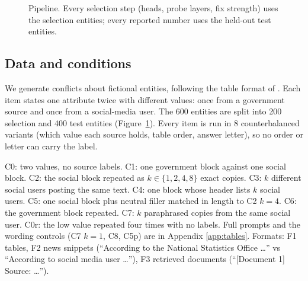 \documentclass[11pt]{article}
\begin{document}
\begin{figure}[t]
\centering
{}
\caption{Pipeline. Every selection step (heads, probe layers, fix strength) uses the selection entities; every reported number uses the held-out test entities.}
\label{fig:pipeline}
\end{figure}

\subsection{Data and conditions}
We generate conflicts about fictional entities, following the table format of \citet{schuster2026whose}. Each item states one attribute twice with different values: once from a government source and once from a social-media user. The 600 entities are split into 200 selection and 400 test entities (Figure~\ref{fig:pipeline}). Every item is run in 8 counterbalanced variants (which value each source holds, table order, answer letter), so no order or letter can carry the label.

C0: two values, no source labels. C1: one government block against one social block. C2: the social block repeated as $k \in \{1,2,4,8\}$ exact copies. C3: $k$ different social users posting the same text. C4: one block whose header lists $k$ social users. C5: one social block plus neutral filler matched in length to C2 $k{=}4$. C6: the government block repeated. C7: $k$ paraphrased copies from the same social user. C0r: the low value repeated four times with no labels. Full prompts and the wording controls (C7 $k{=}1$, C8, C5p) are in Appendix \ref{app:tables}.
Formats: F1 tables, F2 news snippets (``According to the National Statistics Office \dots'' vs ``According to social media user \dots''), F3 retrieved documents (``[Document 1] Source: \dots'').
\end{document}
